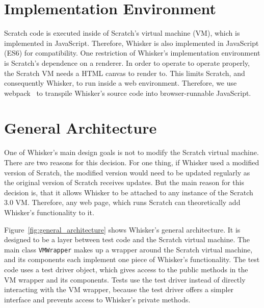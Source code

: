 \section{Implementation Environment}

Scratch code is executed inside of Scratch's virtual machine (VM), which is implemented in JavaScript.
Therefore, Whisker is also implemented in JavaScript (ES6) for compatibility.
One restriction of Whisker's implementation environment is Scratch's dependence on a renderer.
In order to operate to operate properly, the Scratch VM needs a HTML canvas to render to.
This limits Scratch, and consequently Whisker, to run inside a web environment.
Therefore, we use webpack~\cite{webpack} to transpile Whisker's source code into browser-runnable JavaScript.

\section{General Architecture}


One of Whisker's main design goals is not to modify the Scratch virtual machine.
There are two reasons for this decision.
For one thing, if Whisker used a modified version of Scratch,
the modified version would need to be updated regularly as the original version of Scratch receives updates.
But the main reason for this decision is, that it allows Whisker to be attached to any instance of the Scratch 3.0 VM.
Therefore, any web page, which runs Scratch can theoretically add Whisker's functionality to it.
\parspace

Figure~\ref{fig:general_architecture} shows Whisker's general architecture.
It is designed to be a layer between test code and the Scratch virtual machine.
The main class \texttt{VMWrapper} makes up a wrapper around the Scratch virtual machine,
and its components each implement one piece of Whisker's functionality.
The test code uses a test driver object, which gives access to the public methods in the VM wrapper and its components.
Tests use the test driver instead of directly interacting with the VM wrapper,
because the test driver offers a simpler interface and prevents access to Whisker's private methods.
\parspace

